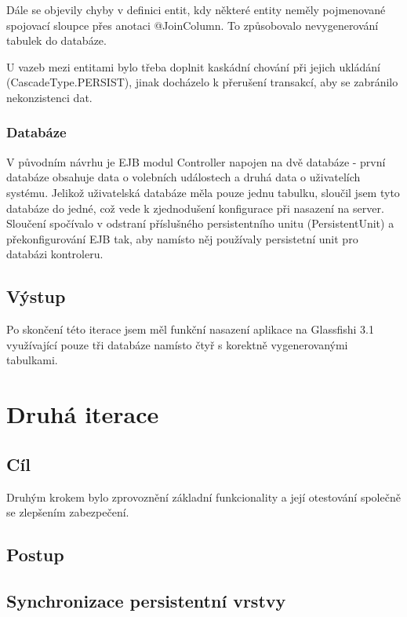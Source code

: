 \documentclass[11pt,twoside,a4paper]{book}
\begin{document}
Dále se objevily chyby v definici entit, kdy některé entity neměly pojmenované spojovací sloupce přes anotaci @JoinColumn. To způsobovalo nevygenerování tabulek do databáze.

U vazeb mezi entitami bylo třeba doplnit kaskádní chování při jejich ukládání (CascadeType.PERSIST), jinak docházelo k přerušení transakcí, aby se zabránilo nekonzistenci dat.

\subsubsection{Databáze}

V původním návrhu je EJB modul Controller napojen na dvě databáze - první databáze obsahuje data o volebních událostech a druhá data o uživatelích systému. Jelikož uživatelská databáze měla pouze jednu tabulku, sloučil jsem tyto databáze do jedné, což vede k zjednodušení konfigurace při nasazení na server. Sloučení spočívalo v odstraní příslušného persistentního unitu (PersistentUnit) a překonfigurování EJB tak, aby namísto něj používaly persistetní unit pro databázi kontroleru.


\subsection{Výstup}

Po skončení této iterace jsem měl funkční nasazení aplikace na Glassfishi 3.1 využívající pouze tři databáze namísto čtyř s korektně vygenerovanými tabulkami.


\section{Druhá iterace}

\subsection{Cíl}

Druhým krokem bylo zprovoznění základní funkcionality a její otestování společně se zlepšením zabezpečení.

\subsection{Postup}

\subsection{Synchronizace persistentní vrstvy}
\end{document}
